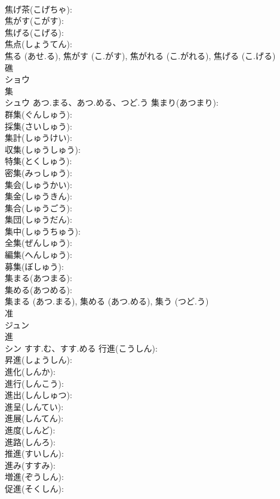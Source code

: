 \documentclass[8pt]{extreport}
\begin{document}
\begin{CJK}{UTF8}{min}
\\	焦げ茶(こげちゃ): 
\\	焦がす(こがす): 
\\	焦げる(こげる): 
\\	焦点(しょうてん): 
\\	焦る (あせ.る), 焦がす (こ.がす), 焦がれる (こ.がれる), 焦げる (こ.げる)
\\	礁			
\\	ショウ			
\\	集			
\\	シュウ	あつ.まる、あつ.める、つど.う	集まり(あつまり): 
\\	群集(ぐんしゅう): 
\\	採集(さいしゅう): 
\\	集計(しゅうけい): 
\\	収集(しゅうしゅう): 
\\	特集(とくしゅう): 
\\	密集(みっしゅう): 
\\	集会(しゅうかい): 
\\	集金(しゅうきん): 
\\	集合(しゅうごう): 
\\	集団(しゅうだん): 
\\	集中(しゅうちゅう): 
\\	全集(ぜんしゅう): 
\\	編集(へんしゅう): 
\\	募集(ぼしゅう): 
\\	集まる(あつまる): 
\\	集める(あつめる): 
\\	集まる (あつ.まる), 集める (あつ.める), 集う (つど.う)
\\	准			
\\	ジュン			
\\	進			
\\	シン	すす.む、すす.める	行進(こうしん): 
\\	昇進(しょうしん): 
\\	進化(しんか): 
\\	進行(しんこう): 
\\	進出(しんしゅつ): 
\\	進呈(しんてい): 
\\	進展(しんてん): 
\\	進度(しんど): 
\\	進路(しんろ): 
\\	推進(すいしん): 
\\	進み(すすみ): 
\\	増進(ぞうしん): 
\\	促進(そくしん): 

\end{CJK}
\end{document}
